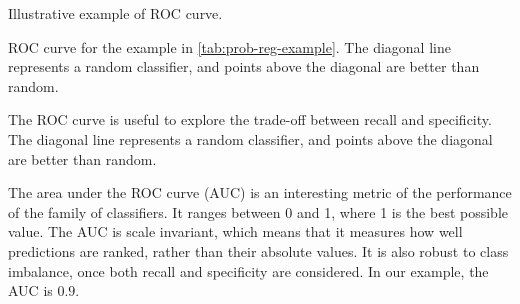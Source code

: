 \begin{figurebox}[label=fig:roc-example]{Illustrative example of ROC curve.}
  \centering
  \tcblower
  ROC curve for the example in \cref{tab:prob-reg-example}.  The diagonal line represents
  a random classifier, and points above the diagonal are better than random.
\end{figurebox}

The ROC curve is useful to explore the trade-off between recall and specificity.  The
diagonal line represents a random classifier, and points above the diagonal are better
than random.

The area under the ROC curve (AUC) is an interesting metric of the performance of the
family of classifiers.  It ranges between 0 and 1, where 1 is the best possible value.
The AUC is scale invariant, which means that it measures how well
predictions are ranked, rather than their absolute values.  It is also robust to
class imbalance, once both recall and specificity are considered.
In our example, the AUC is $0.9$.


